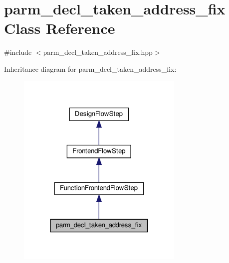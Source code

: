 \hypertarget{classparm__decl__taken__address__fix}{}\section{parm\+\_\+decl\+\_\+taken\+\_\+address\+\_\+fix Class Reference}
\label{classparm__decl__taken__address__fix}


{\ttfamily \#include $<$parm\+\_\+decl\+\_\+taken\+\_\+address\+\_\+fix.\+hpp$>$}



Inheritance diagram for parm\+\_\+decl\+\_\+taken\+\_\+address\+\_\+fix\+:
\nopagebreak
\begin{figure}[H]
\begin{center}
\leavevmode
\includegraphics[width=226pt]{df/dc0/classparm__decl__taken__address__fix__inherit__graph}
\end{center}
\end{figure}


